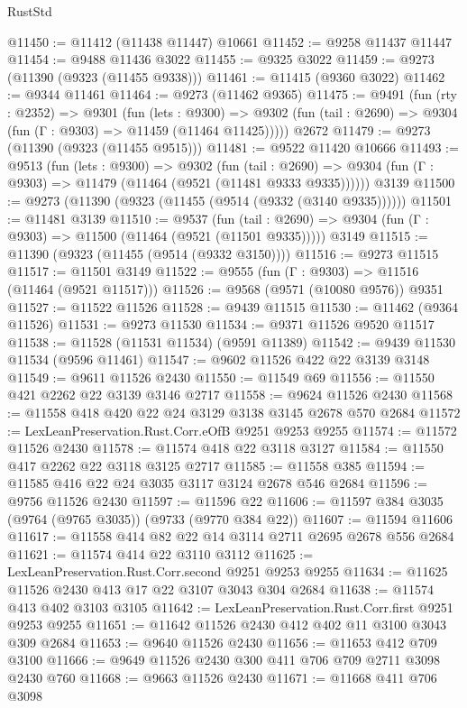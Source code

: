 \begin{lexlean}{RustStd}
\begin{coremodule}
@11450 := @11412 (@11438 @11447) @10661
@11452 := @9258 @11437 @11447
@11454 := @9488 @11436 @3022
@11455 := @9325 @3022
@11459 := @9273 (@11390 (@9323 (@11455 @9338)))
@11461 := @11415 (@9360 @3022)
@11462 := @9344 @11461
@11464 := @9273 (@11462 @9365)
@11475 := @9491
    (fun (rty : @2352) =>
    @9301
      (fun (lets : @9300) =>
      @9302 (fun (tail : @2690) => @9304 (fun (Γ : @9303) => @11459 (@11464 @11425)))))
    @2672
@11479 := @9273 (@11390 (@9323 (@11455 @9515)))
@11481 := @9522 @11420 @10666
@11493 := @9513
    (fun (lets : @9300) =>
    @9302
      (fun (tail : @2690) =>
      @9304 (fun (Γ : @9303) => @11479 (@11464 (@9521 (@11481 @9333 @9335))))))
    @3139
@11500 := @9273 (@11390 (@9323 (@11455 (@9514 (@9332 (@3140 @9335))))))
@11501 := @11481 @3139
@11510 := @9537
    (fun (tail : @2690) => @9304 (fun (Γ : @9303) => @11500 (@11464 (@9521 (@11501 @9335)))))
    @3149
@11515 := @11390 (@9323 (@11455 (@9514 (@9332 @3150))))
@11516 := @9273 @11515
@11517 := @11501 @3149
@11522 := @9555 (fun (Γ : @9303) => @11516 (@11464 (@9521 @11517)))
@11526 := @9568 (@9571 (@10080 @9576)) @9351
@11527 := @11522 @11526
@11528 := @9439 @11515
@11530 := @11462 (@9364 @11526)
@11531 := @9273 @11530
@11534 := @9371 @11526 @9520 @11517
@11538 := @11528 (@11531 @11534) (@9591 @11389)
@11542 := @9439 @11530 @11534 (@9596 @11461)
@11547 := @9602 @11526 @422 @22 @3139 @3148
@11549 := @9611 @11526 @2430
@11550 := @11549 @69
@11556 := @11550 @421 @2262 @22 @3139 @3146 @2717
@11558 := @9624 @11526 @2430
@11568 := @11558 @418 @420 @22 @24 @3129 @3138 @3145 @2678 @570 @2684
@11572 := LexLeanPreservation.Rust.Corr.eOfB @9251 @9253 @9255
@11574 := @11572 @11526 @2430
@11578 := @11574 @418 @22 @3118 @3127
@11584 := @11550 @417 @2262 @22 @3118 @3125 @2717
@11585 := @11558 @385
@11594 := @11585 @416 @22 @24 @3035 @3117 @3124 @2678 @546 @2684
@11596 := @9756 @11526 @2430
@11597 := @11596 @22
@11606 := @11597 @384 @3035 (@9764 (@9765 @3035)) (@9733 (@9770 @384 @22))
@11607 := @11594 @11606
@11617 := @11558 @414 @82 @22 @14 @3114 @2711 @2695 @2678 @556 @2684
@11621 := @11574 @414 @22 @3110 @3112
@11625 := LexLeanPreservation.Rust.Corr.second @9251 @9253 @9255
@11634 := @11625 @11526 @2430 @413 @17 @22 @3107 @3043 @304 @2684
@11638 := @11574 @413 @402 @3103 @3105
@11642 := LexLeanPreservation.Rust.Corr.first @9251 @9253 @9255
@11651 := @11642 @11526 @2430 @412 @402 @11 @3100 @3043 @309 @2684
@11653 := @9640 @11526 @2430
@11656 := @11653 @412 @709 @3100
@11666 := @9649 @11526 @2430 @300 @411 @706 @709 @2711 @3098 @2430 @760
@11668 := @9663 @11526 @2430
@11671 := @11668 @411 @706 @3098

\end{coremodule}
\end{lexlean}
